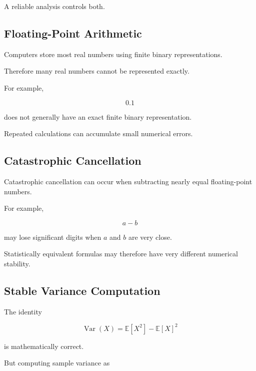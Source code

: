 A reliable analysis controls both.

\subsection{Floating-Point Arithmetic}
\label{subsec:floating-point-statistics}

Computers store most real numbers using finite binary representations.

Therefore many real numbers cannot be represented exactly.

For example,

\[
\boxed{
0.1
}
\]

does not generally have an exact finite binary representation.

Repeated calculations can accumulate small numerical errors.

\subsection{Catastrophic Cancellation}
\label{subsec:catastrophic-cancellation}

Catastrophic cancellation can occur when subtracting nearly equal
floating-point numbers.

For example,

\[
\boxed{
a-b
}
\]

may lose significant digits when \(a\) and \(b\) are very close.

Statistically equivalent formulas may therefore have very different
numerical stability.

\subsection{Stable Variance Computation}
\label{subsec:stable-variance-computation}

The identity

\[
\operatorname{Var}(X)
=
\mathbb{E}[X^2]
-
\mathbb{E}[X]^2
\]

is mathematically correct.

But computing sample variance as

